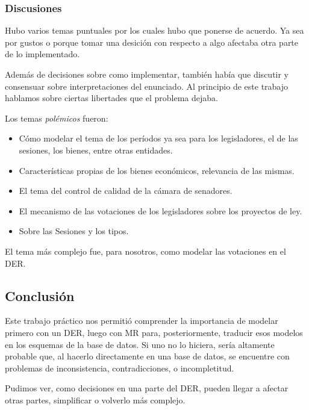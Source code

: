 \subsubsection{Discusiones}

\quad Hubo varios temas puntuales por los cuales hubo que ponerse de acuerdo. Ya sea por gustos o porque tomar una desici\'on con respecto a algo afectaba otra parte de lo implementado.

\quad Adem\'as de decisiones sobre como implementar, tambi\'en hab\'ia que discutir y consensuar sobre interpretaciones del enunciado. Al principio de este trabajo hablamos sobre ciertas libertades que el problema dejaba.

\quad Los temas \textit{pol\'emicos} fueron:

\begin{itemize}
  \item C\'omo modelar el tema de los per\'iodos ya sea para los legisladores, el de las sesiones, los bienes, entre otras entidades.
  
  
  \item Caracter\'isticas propias de los bienes econ\'omicos, relevancia de las mismas.
  
  
  \item El tema del control de calidad de la c\'amara de senadores.
  
  
  \item El mecanismo de las votaciones de los legisladores sobre los proyectos de ley.
  
  
  \item Sobre las Sesiones y los tipos.
\end{itemize}

\quad El tema m\'as complejo fue, para nosotros, como modelar las votaciones en el DER.

\subsection{Conclusi\'on}

\quad Este trabajo pr\'actico nos permiti\'o comprender la importancia de modelar primero con un DER, luego con MR para, posteriormente, traducir esos modelos en los esquemas de la base de datos. Si uno no lo hiciera, ser\'ia altamente probable que, al hacerlo directamente en una base de datos, se encuentre con problemas de inconsistencia, contradicciones, o incompletitud.

\quad Pudimos ver, como decisiones en una parte del DER, pueden llegar a afectar otras partes, simplificar o volverlo m\'as complejo.